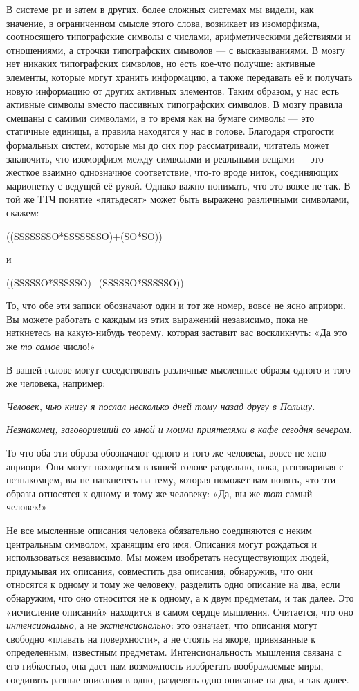 \documentclass[../main.tex]{subfiles}
\begin{document}
В системе \textbf{pr} и затем в других, более сложных системах мы видели, как значение, в ограниченном смысле этого слова, возникает из изоморфизма, соотносящего типографские символы с числами, арифметическими действиями и отношениями, а строчки типографских символов --- с высказываниями. В мозгу нет никаких типографских символов, но есть кое-что получше: активные элементы, которые могут хранить информацию, а также передавать её и получать новую информацию от других активных элементов. Таким образом, у нас есть активные символы вместо пассивных типографских символов. В мозгу правила смешаны с самими символами, в то время как на бумаге символы --- это статичные единицы, а правила находятся у нас в голове. Благодаря строгости формальных систем, которые мы до сих пор рассматривали, читатель может заключить, что изоморфизм между символами и реальными вещами --- это жесткое взаимно однозначное соответствие, что-то вроде ниток, соединяющих марионетку с ведущей её рукой. Однако важно понимать, что это вовсе не так. В той же ТТЧ понятие «пятьдесят» может быть выражено различными символами, скажем:
\begin{center}
    ((SSSSSSSO*SSSSSSSO)+(SO*SO))

    и

    ((SSSSSO*SSSSSO)+(SSSSSO*SSSSSO))
\end{center}


То, что обе эти записи обозначают один и тот же номер, вовсе не ясно априори. Вы можете работать с каждым из этих выражений независимо, пока не наткнетесь на какую-нибудь теорему, которая заставит вас воскликнуть: «Да это же \emph{то самое} число!»

В вашей голове могут соседствовать различные мысленные образы одного и того же человека, например:

\emph{Человек, чью книгу я послал несколько дней тому назад другу в Польшу.}

\emph{Незнакомец, заговоривший со мной и моими приятелями в кафе сегодня вечером.}

То что оба эти образа обозначают одного и того же человека, вовсе не ясно априори. Они могут находиться в вашей голове раздельно, пока, разговаривая с незнакомцем, вы не наткнетесь на тему, которая поможет вам понять, что эти образы относятся к одному и тому же человеку: «Да, вы же \emph{тот} самый человек!»

Не все мысленные описания человека обязательно соединяются с неким центральным символом, хранящим его имя. Описания могут рождаться и использоваться независимо. Мы можем изобретать несуществующих людей, придумывая их описания, совместить два описания, обнаружив, что они относятся к одному и тому же человеку, разделить одно описание на два, если обнаружим, что оно относится не к одному, а к двум предметам, и так далее. Это «исчисление описаний» находится в самом сердце мышления. Считается, что оно \emph{интенсионально}, а не \emph{экстенсионально}: это означает, что описания могут свободно «плавать на поверхности», а не стоять на якоре, привязанные к определенным, известным предметам. Интенсиональность мышления связана с его гибкостью, она дает нам возможность изобретать воображаемые миры, соединять разные описания в одно, разделять одно описание на два, и так далее.
\end{document}
